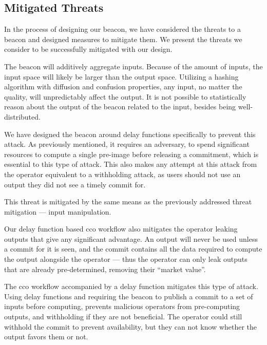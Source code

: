 \subsection{Mitigated Threats}
In the process of designing our beacon, we have considered the threats to a beacon and designed measures to mitigate them.
We present the threats we consider to be successfully mitigated with our design.

The beacon will additively aggregate inputs.
Because of the amount of inputs, the input space will likely be larger than the output space.
Utilizing a hashing algorithm with diffusion and confusion properties, any input, no matter the quality, will unpredictably affect the output.
It is not possible to statistically reason about the output of the beacon related to the input, besides being well-distributed.

We have designed the beacon around delay functions specifically to prevent this attack.
As previously mentioned, it requires an adversary, to spend significant resources to compute a single pre-image before releasing a commitment, which is essential to this type of attack.
This also makes any attempt at this attack from the operator equivalent to a withholding attack, as users should not use an output they did not see a timely commit for.

This threat is mitigated by the same means as the previously addressed threat mitigation --- input manipulation.

Our delay function based \gls{cco} workflow also mitigates the operator leaking outputs that give any significant advantage.
An output will never be used unless a commit for it is seen, and the commit contains all the data required to compute the output alongside the operator --- thus the operator can only leak outputs that are already pre-determined, removing their \enquote{market value}.

The \gls{cco} workflow accompanied by a delay function mitigates this type of attack.
Using delay functions and requiring the beacon to publish a commit to a set of inputs before computing, prevents malicious operators from pre-computing outputs, and withholding if they are not beneficial.
The operator could still withhold the commit to prevent availability, but they can not know whether the output favors them or not.

